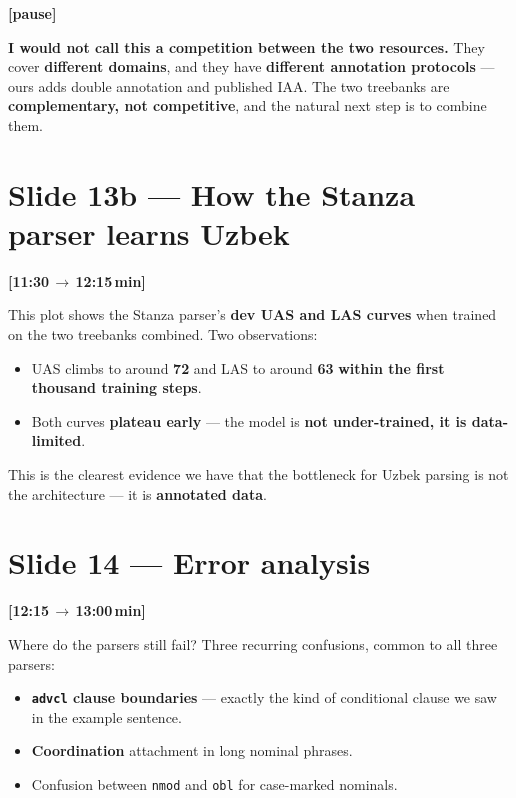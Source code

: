 \documentclass[12pt,a4paper]{article}
\newcommand{\timing}[2]{%
   \par\noindent\textbf{\small [#1\,$\to$\,#2\,min]}\par\vspace{0.2em}}
\newcommand{\say}[1]{\textbf{#1}}
\newcommand{\pause}{\par\vspace{0.4em}\textbf{[pause]}\par}
\begin{document}
\pause

\say{I would not call this a competition between the two resources.} They
cover \textbf{different domains}, and they have \textbf{different annotation
protocols} — ours adds double annotation and published IAA. The two
treebanks are \textbf{complementary, not competitive}, and the natural next
step is to combine them.

\section*{Slide 13b — How the Stanza parser learns Uzbek}
\timing{11:30}{12:15}

This plot shows the Stanza parser's \textbf{dev UAS and LAS curves} when
trained on the two treebanks combined. Two observations:

\begin{itemize}
   \item UAS climbs to around \textbf{72} and LAS to around \textbf{63} \say{within the first thousand training steps}.
   \item Both curves \textbf{plateau early} — the model is \say{not under-trained, it is data-limited}.
\end{itemize}

\noindent
This is the clearest evidence we have that the bottleneck for Uzbek
parsing is not the architecture — it is \textbf{annotated data}.

\section*{Slide 14 — Error analysis}
\timing{12:15}{13:00}

Where do the parsers still fail? Three recurring confusions, common to
all three parsers:

\begin{itemize}
   \item \textbf{\texttt{advcl} clause boundaries} — exactly the kind of conditional clause we saw in the example sentence.
   \item \textbf{Coordination} attachment in long nominal phrases.
   \item Confusion between \texttt{nmod} and \texttt{obl} for case-marked nominals.
\end{itemize}
\end{document}
